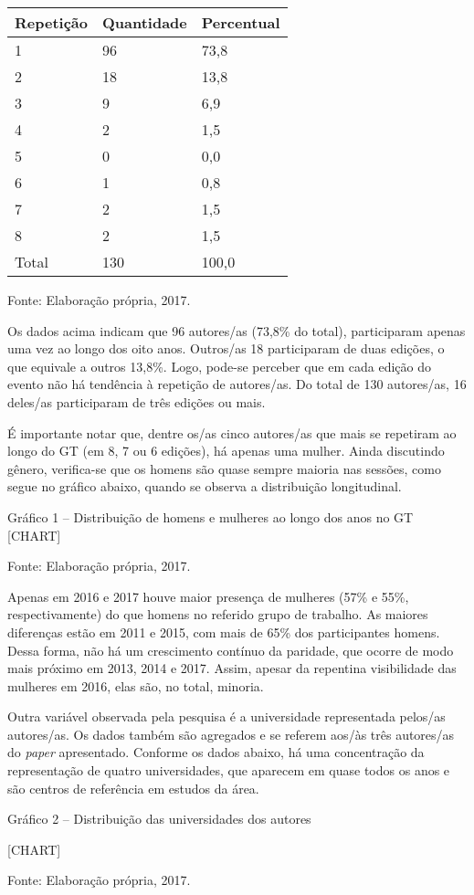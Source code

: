 \begin{longtable}[]{@{}lll@{}}
\toprule
Repetição & Quantidade & Percentual\tabularnewline
\midrule
\endhead
1 & 96 & 73,8\tabularnewline
2 & 18 & 13,8\tabularnewline
3 & 9 & 6,9\tabularnewline
4 & 2 & 1,5\tabularnewline
5 & 0 & 0,0\tabularnewline
6 & 1 & 0,8\tabularnewline
7 & 2 & 1,5\tabularnewline
8 & 2 & 1,5\tabularnewline
Total & 130 & 100,0\tabularnewline
\bottomrule
\end{longtable}

Fonte: Elaboração própria, 2017.

Os dados acima indicam que 96 autores/as (73,8\% do total), participaram
apenas uma vez ao longo dos oito anos. Outros/as 18 participaram de duas
edições, o que equivale a outros 13,8\%. Logo, pode-se perceber que em
cada edição do evento não há tendência à repetição de autores/as. Do
total de 130 autores/as, 16 deles/as participaram de três edições ou
mais.

É importante notar que, dentre os/as cinco autores/as que mais se
repetiram ao longo do GT (em 8, 7 ou 6 edições), há apenas uma mulher.
Ainda discutindo gênero, verifica-se que os homens são quase sempre
maioria nas sessões, como segue no gráfico abaixo, quando se observa a
distribuição longitudinal.

Gráfico 1 -- Distribuição de homens e mulheres ao longo dos anos no GT
{{[}CHART{]}}

Fonte: Elaboração própria, 2017.

Apenas em 2016 e 2017 houve maior presença de mulheres (57\% e 55\%,
respectivamente) do que homens no referido grupo de trabalho. As maiores
diferenças estão em 2011 e 2015, com mais de 65\% dos participantes
homens. Dessa forma, não há um crescimento contínuo da paridade, que
ocorre de modo mais próximo em 2013, 2014 e 2017. Assim, apesar da
repentina visibilidade das mulheres em 2016, elas são, no total,
minoria.

Outra variável observada pela pesquisa é a universidade representada
pelos/as autores/as. Os dados também são agregados e se referem aos/às
três autores/as do \emph{paper} apresentado. Conforme os dados abaixo,
há uma concentração da representação de quatro universidades, que
aparecem em quase todos os anos e são centros de referência em estudos
da área.

Gráfico 2 -- Distribuição das universidades dos autores

{{[}CHART{]}}

Fonte: Elaboração própria, 2017.

